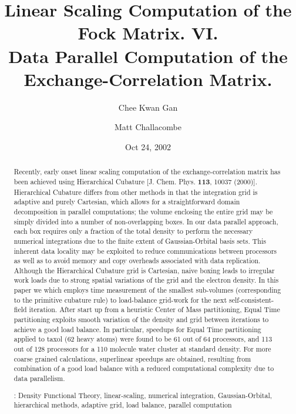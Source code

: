 \commentoutA{\documentclass[prl,aps,twocolumn,showpacs,twocolumngrid,superbib]{revtex4}}
\begin{document}
\title[Short Title]{ Linear Scaling Computation of the Fock Matrix. VI. \\ 
                     Data Parallel Computation of the Exchange-Correlation Matrix.\footnotemark[4] }

\author{Chee Kwan Gan\footnotemark[2]}
\author{Matt Challacombe\footnotemark[3]}
 


\date{Oct 24, 2002}

\begin{abstract}
Recently, early onset linear scaling computation of the
exchange-correlation matrix has been achieved using Hierarchical
Cubature [J. Chem. Phys. {\bf 113}, 10037 (2000)]. Hierarchical
Cubature differs from other methods in that the integration grid is
adaptive and purely Cartesian, which allows for a straightforward
domain decomposition in parallel computations; the volume enclosing
the entire grid may be simply divided into a number of non-overlapping
boxes. In our data parallel approach, each box requires only a fraction 
of the total density to perform the necessary numerical integrations
due to the finite extent of Gaussian-Orbital basis sets.  This inherent 
data locality may be exploited to reduce communications between processors 
as well as to avoid memory and copy overheads associated with data 
replication.  Although the Hierarchical Cubature grid is Cartesian, 
naive boxing leads to irregular work loads due to strong spatial variations 
of the grid and the electron density.  In this paper we
which employs time measurement of the smallest sub-volumes
(corresponding to the primitive cubature rule) to load-balance
grid-work for the next self-consistent-field iteration.  After start
up from a heuristic Center of Mass partitioning, Equal Time
partitioning exploits smooth variation of the density and grid between
iterations to achieve a good load balance. In particular, speedups for
Equal Time partitioning applied to taxol (62 heavy atoms) were found
to be 61 out of 64 processors, and 113 out of 128 processors for a 110
molecule water cluster at standard density.  For more coarse grained
calculations, superlinear speedups are obtained, resulting from
combination of a good load balance with a reduced computational
complexity due to data parallelism.

\smallskip
{}: Density Functional Theory, linear-scaling, numerical integration, Gaussian-Orbital, 
                         hierarchical methods, adaptive grid, load balance, parallel computation
\end{abstract}
\end{document}
